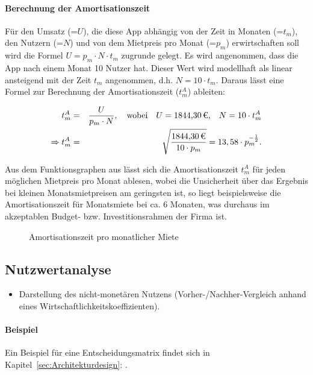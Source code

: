 \paragraph{Berechnung der Amortisationszeit}
Für den Umsatz (=$U$), die diese App abhängig von der Zeit in Monaten (=$t_m$), den Nutzern (=$N$) und von dem Mietpreis pro Monat (=$p_m$) erwirtschaften soll wird die Formel $U = p_m \cdot N \cdot t_m$ zugrunde gelegt. Es wird angenommen, dass die App nach einem Monat 10 Nutzer hat. Dieser Wert wird modellhaft als linear ansteigend mit der Zeit $t_m$ angenommen, d.h. $N = 10 \cdot t_m$. Daraus lässt eine Formel zur Berechnung der Amortisationszeit ($t^{A}_m$) ableiten:

\begin{eqnarray}
	t^{A}_m &=& \frac{U}{p_m \cdot N},\quad \mbox{wobei}\quad U = \mbox{\eur{1844,30},}\quad N = 10 \cdot t_m^{A}\\
	\Rightarrow t^{A}_m &=& \sqrt{\frac{\eur{1844,30}}{10 \cdot p_m}} = 13,58 \cdot p_m^{-\frac{1}{2}}.
\end{eqnarray}

Aus dem Funktionsgraphen aus  lässt sich die Amortisationszeit $t_m^{A}$ für jeden möglichen Mietpreis pro Monat ablesen, wobei die Unsicherheit über das Ergebnis bei kleinen Monatsmietpreisen am geringsten ist, so liegt beispielsweise die Amortisationszeit für  Monatsmiete bei ca. 6 Monaten, was durchaus im akzeptablen Budget- bzw. Investitionsrahmen der Firma ist.

\begin{figure}[htb]
\centering
{}
\caption{Amortisationszeit pro monatlicher Miete}
\label{fig:AM}
\end{figure}

\subsection{Nutzwertanalyse}
\label{sec:Nutzwertanalyse}
\begin{itemize}
	\item Darstellung des nicht-monetären Nutzens (\zB Vorher-/Nachher-Vergleich anhand eines Wirtschaftlichkeitskoeffizienten). 
\end{itemize}

\paragraph{Beispiel}
Ein Beispiel für eine Entscheidungsmatrix findet sich in Kapitel~\ref{sec:Architekturdesign}: .


